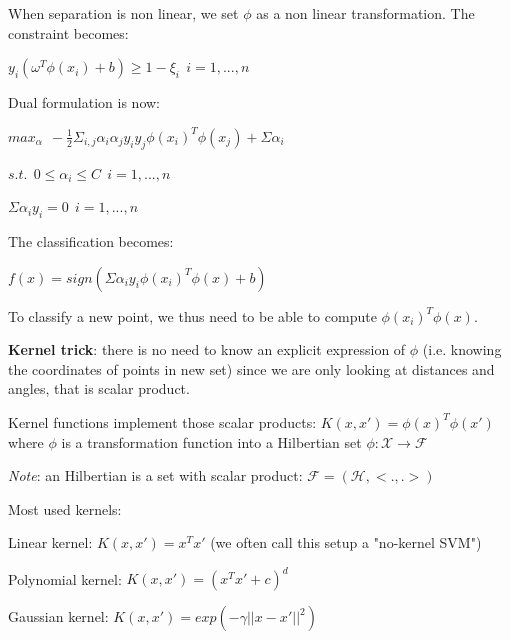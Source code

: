 When separation is non linear, we set $\phi$ as a non linear transformation. The constraint becomes:

$y_i(\omega^T\phi(x_i)+b) \geq 1 - \xi_i~~i=1,...,n$

\vspace{5mm}

Dual formulation is now:

\begin{center}

$max_\alpha~~-\frac{1}{2}\Sigma_{i,j} \alpha_i \alpha_j y_i y_j \phi(x_i)^T \phi(x_j) + \Sigma \alpha_i$

$s.t.~~0 \leq \alpha_i \leq C~~i=1,...,n$

$\Sigma \alpha_i y_i = 0~~i=1,...,n$

\end{center}

\vspace{5mm}

The classification becomes:

\begin{center}
$f(x)=sign(\Sigma \alpha_i y_i \phi(x_i)^T \phi(x) + b)$
\end{center}

To classify a new point, we thus need to be able to compute $\phi(x_i)^T \phi(x)$.

\vspace{5mm}

\textbf{Kernel trick}: there is no need to know an explicit expression of $\phi$ (i.e. knowing the coordinates of points in new set) since we are only looking at distances and angles, that is scalar product.

\vspace{5mm}

Kernel functions implement those scalar products: $K(x,x')=\phi(x)^T \phi(x')$ where $\phi$ is a transformation function into a Hilbertian set $\phi : \mathcal{X} \to \mathcal{F} $

\textit{Note}: an Hilbertian is a set with scalar product: $\mathcal{F}=(\mathcal{H},<.,.>)$

\vspace{5mm}

Most used kernels:

Linear kernel: $K(x,x') = x^Tx'$ (we often call this setup a "no-kernel SVM")

Polynomial kernel: $K(x,x') = (x^Tx'+c)^d$

Gaussian kernel: $K(x,x') = exp(-\gamma||x-x'||^2)$

